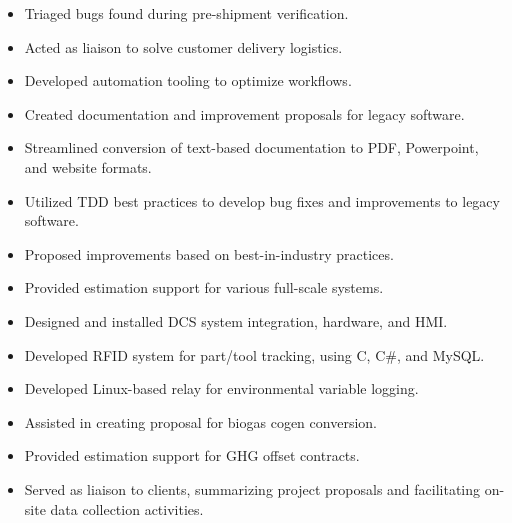 \documentclass[a4paper,ragged2e,withhyper]{altacv}
\begin{document}
\begin{itemize}
\item Triaged bugs found during pre-shipment verification.
\item Acted as liaison to solve customer delivery logistics.
\item Developed automation tooling to optimize workflows.
\item Created documentation and improvement proposals for legacy software.
\item Streamlined conversion of text-based documentation to PDF, Powerpoint, and website formats.
\item Utilized TDD best practices to develop bug fixes and improvements to legacy software.
\end{itemize}

\divider

\begin{itemize}
\item Proposed improvements based on best-in-industry practices.
\item Provided estimation support for various full-scale systems.
\item Designed and installed DCS system integration, hardware, and HMI.
\item Developed RFID system for part/tool tracking, using C, C\#, and MySQL.
\end{itemize}

\divider

\begin{itemize}
\item Developed Linux-based relay for environmental variable logging.
\item Assisted in creating proposal for biogas cogen conversion.
\item Provided estimation support for GHG offset contracts.
\item Served as liaison to clients, summarizing project proposals and facilitating on-site data collection activities.
\end{itemize}
\end{document}
